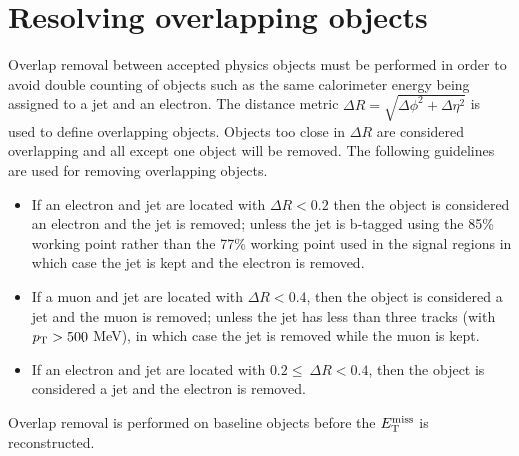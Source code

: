 \section{Resolving overlapping objects}
\label{sec:Selection_overlap}

\indent Overlap removal between accepted physics objects must be performed in order to avoid double counting of objects such as the same calorimeter energy being assigned to a jet and an electron.  The distance metric  $\Delta R = \sqrt{\Delta \phi^2 + \Delta \eta^2}$ is used to define overlapping objects.  Objects too close in $\Delta R$ are considered overlapping and all except one object will be removed.  The following guidelines are used for removing overlapping objects. \\

\begin{itemize}
\item If an electron and jet are located with $\Delta R < 0.2$ then the object is considered an electron and  the jet is removed; unless the jet is b-tagged using the 85\% working point rather than the 77\% working point used in the signal regions in which case the jet is kept and the electron is removed. 
\item If a muon and jet are located with $\Delta R < 0.4$, then the object is considered a jet and the muon is removed; unless the jet has less than three tracks (with $p_{\mathrm{T}}>500$ MeV), in which case the jet is removed while the muon is kept. 
\item If an electron and jet are located with $0.2 \leq\ \Delta R < 0.4$, then the object is considered a jet and the electron is removed.
\end{itemize}

\indent Overlap removal is performed on baseline objects before the $E_{\mathrm{T}}^{\mathrm{miss}}$ is reconstructed. \\


